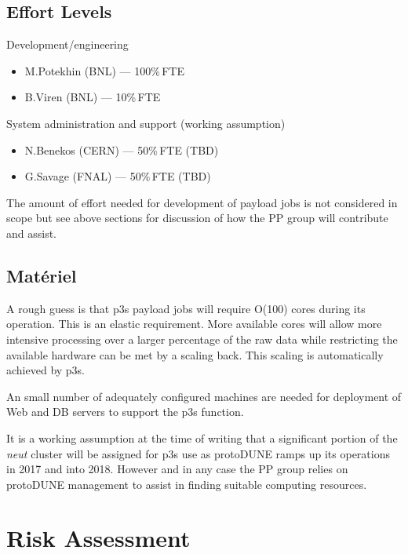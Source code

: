 \documentclass[pdftex,12pt,letter]{article}
\newcommand{\pd}{protoDUNE\xspace}
\begin{document}
\subsection{Effort Levels}

Development/engineering
\begin{itemize}
\item M.Potekhin (BNL) --- 100\%\,FTE
\item B.Viren (BNL) --- 10\%\,FTE
\end{itemize}

\noindent System administration and support (working assumption)

\begin{itemize}
\item N.Benekos (CERN) --- 50\%\,FTE (TBD)
\item G.Savage (FNAL) --- 50\%\,FTE (TBD)
\end{itemize}

\noindent The amount of effort needed for development of payload jobs
is not considered in scope but see above sections for discussion of
how the PP group will contribute and assist.

\subsection{Mat\'eriel}

A rough guess is that p3s payload jobs will require O(100) cores
during its operation.  This is an elastic requirement.  More available
cores will allow more intensive processing over a larger percentage of
the raw data while restricting the available hardware can be met by a
scaling back.  This scaling is automatically achieved by p3s.

An small number of adequately configured machines are needed for
deployment of Web and DB servers to support the p3s function.  

It is a working assumption at the time of writing that a significant
portion of the \textit{neut} cluster \cite{neut} will be assigned for
p3s use as \pd ramps up its operations in 2017 and into 2018.  However
and in any case the PP group relies on \pd management to assist in
finding suitable computing resources.


\section{Risk Assessment}
\label{sec:risk}
\end{document}
